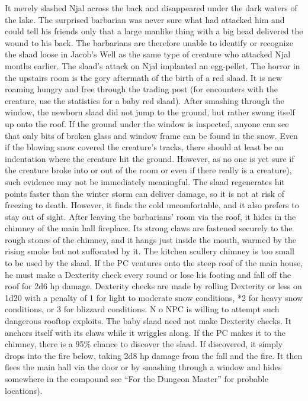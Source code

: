 \documentclass[a5paper,11pt,twoside]{book}
\begin{document}
{It merely slashed Njal across the back and disappeared under the dark waters of the lake.
The surprised barbarian was never sure what had attacked him and could tell his friends only that a large manlike thing with a big head delivered the wound to his back.
The barbarians are therefore unable to identify or recognize the slaad loose in Jacob’s Well as the same type of creature who attacked Njal months earlier.
The slaad’s attack on Njal implanted an egg-pellet.
The horror in the upstairs room is the gory aftermath of the birth of a red slaad.
It is new roaming hungry and free through the trading post (for encounters with the creature, use the statistics for a baby red slaad).
After smashing through the window, the newborn slaad did not jump to the ground, but rather swung itself up onto the roof.
If the ground under the window is inspected, anyone can see that only bits of broken glass and window frame can be found in the snow.
Even if the blowing snow covered the creature’s tracks, there should at least be an indentation where the creature hit the ground.
However, as no one is yet sure if the creature broke into or out of the room {or even if there really is a creature), such evidence may not be immediately meaningful.
The slaad regenerates hit points faster than the winter storm can deliver damage, so it is not at risk of freezing to death.
However, it finds the cold uncomfortable, and it also prefers to stay out of sight.
After leaving the barbarians’ room via the roof, it hides in the chimney of the main hall fireplace.
Its strong claws are fastened securely to the rough stones of the chimney, and it hangs just inside the mouth, warmed by the rising smoke but not suffocated by it.
The kitchen scullery chimney is too small to be used by the slaad.
If the PC ventures onto the steep roof of the main house, he must make a Dexterity check every round or lose his footing and fall off the roof for 2d6 hp damage.
Dexterity checks are made by rolling Dexterity or less on 1d20 with a penalty of 1 for light to moderate snow conditions, *2 for heavy snow conditions, or 3 for blizzard conditions.
N o NPC is willing to attempt such dangerous rooftop exploits.
 The baby slaad need not make Dexterity checks.
It anchors itself with its claws while it wriggles along.
If the PC makes it to the chimney, there is a 95\% chance to discover the slaad.
If discovered, it simply drops into the fire below, taking 2d8 hp damage from the fall and the fire.
It then flees the main hall via the door or by smashing through a window and hides somewhere in the compound {see “For the Dungeon Master” for probable locations).
}}}
\end{document}
